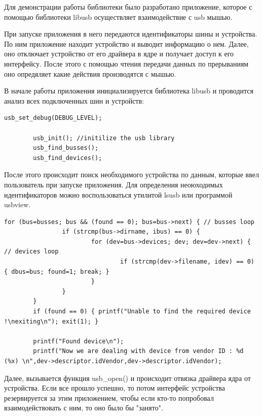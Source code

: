 \documentclass[14pt,a4paper]{article}
\begin{document}
Для демонстрации работы библиотеки было разработано приложение, которое с помощью библиотеки libusb осуществляет взаимодействие с usb мышью.\\

\par При запуске приложения в него передаются идентификаторы шины и устройства. По ним приложение находит устройство и выводит информацию о нем. Далее, оно отключает устройство от его драйвера в ядре и получает доступ к его интерфейсу. После этого с помощью чтения передачи данных по прерываниям оно опредяляет какие действия производятся с мышью.\\

\par В начале работы приложения инициализируется библиотека libusb и проводится анализ всех подключенных шин и устройств:

\begin{lstlisting}[language=c caption={}]
        usb_set_debug(DEBUG_LEVEL);

        usb_init(); //initilize the usb library
        usb_find_busses();
        usb_find_devices();
\end{lstlisting}

После этого происходит поиск необходимого устройства по данным, которые ввел пользователь при запуске приложения. Для определения неоюходимых идентификаторов можно воспользоваться утилитой lsusb или программой usbview.


\begin{lstlisting}[language=c caption={Нахождение устройства }]
        for (bus=busses; bus && (found == 0); bus=bus->next) { // busses loop
                if (strcmp(bus->dirname, ibus) == 0) {
                        for (dev=bus->devices; dev; dev=dev->next) { // devices loop
                                if (strcmp(dev->filename, idev) == 0) { dbus=bus; found=1; break; }
                        }
                }
        }
        if (found == 0) { printf("Unable to find the required device !\nexiting\n"); exit(1); }
        
        printf("Found device\n");
        printf("Now we are dealing with device from vendor ID : %d (%x) \n",dev->descriptor.idVendor,dev->descriptor.idVendor);
\end{lstlisting}

Далее, вызывается функция usb\_open() и происходит отвязка драйвера ядра от устройства. Если все прошло успешно, то потом интерфейс устройства резервируется за этим приложением, чтобы если кто-то попробовал взаимодействовать с ним, то оно было бы "занято".
\end{document}
